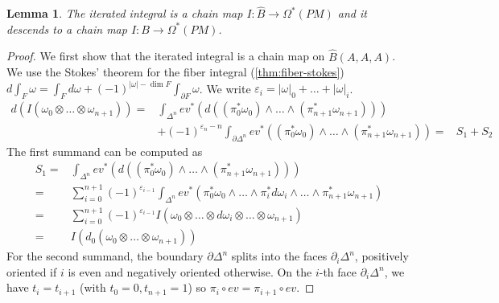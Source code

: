 \documentclass{scrartcl}
\theoremstyle{plain}
\newtheorem{lemma}[theorem]{Lemma}
\theoremstyle{definition}
\renewcommand{\epsilon}{\varepsilon}
\newcommand{\abs}[1]{\left\lvert#1\right\rvert}
\newcommand{\comp}{\mathbin{\circ}}
\begin{document}
\begin{lemma}\label{lem:integral-chain-map}
    The iterated integral is a chain map $I\colon \hat B\to \Omega^*(PM)$ and it descends to a chain map $I\colon B\to \Omega^*(PM)$. %
\end{lemma}
\begin{proof}
    We first show that the iterated integral is a chain map on $\hat B(A, A, A)$. We use the Stokes' theorem for the fiber integral (\cref{thm:fiber-stokes}) $d\int_{F} \omega = \int_{F}d\omega + (-1)^{\abs{\omega} - \dim F} \int_{\partial F}\omega$. We write $\epsilon_i = \abs\omega_0+\dots+\abs\omega_i$.
    \begin{align*}
        d\left(I\left( \omega_0\otimes\dots\otimes\omega_{n+1}\right)\right) =& \int_{\Delta^n} ev^*\left(d\left((\pi_0^*\omega_0)\wedge\dots\wedge(\pi_{n+1}^*\omega_{n+1})\right)\right) \\&
        + (-1)^{\epsilon_n - n} \int_{\partial\Delta^n} ev^*\left((\pi_0^*\omega_0)\wedge\dots\wedge(\pi_{n+1}^*\omega_{n+1})\right) 
        =& S_1 + S_2
    \end{align*}
    The first summand can be computed as  
    \begin{align*}
        S_1 =&\int_{\Delta^n} ev^*\left(d\left((\pi_0^*\omega_0)\wedge\dots\wedge(\pi_{n+1}^*\omega_{n+1})\right)\right) \\
        =&\sum_{i=0}^{n+1} (-1)^{\epsilon_{i-1}}\int_{\Delta^n} ev^*\left(\pi_0^*\omega_0 \wedge \dots\wedge \pi_i^*d\omega_i\wedge\dots\wedge\pi_{n+1}^*\omega_{n+1}\right)\\
        =& \sum_{i=0}^{n+1} (-1)^{\epsilon_{i-1}} I\left(\omega_0\otimes\dots \otimes d\omega_i\otimes\dots\otimes\omega_{n+1}\right) \\
        =& I(d_0(\omega_0\otimes\dots \otimes \omega_{n+1}))
    \end{align*}
    For the second summand, the boundary $\partial \Delta^n$ splits into the faces $\partial_i\Delta^n$, positively oriented if $i$ is even and negatively oriented otherwise. On the $i$-th face $\partial_i\Delta^n$, we have $t_i=t_{i+1}$ (with $t_0=0, t_{n+1}=1$) so $\pi_i\comp ev=\pi_{i+1}\comp ev$.


\end{proof}
\end{document}
